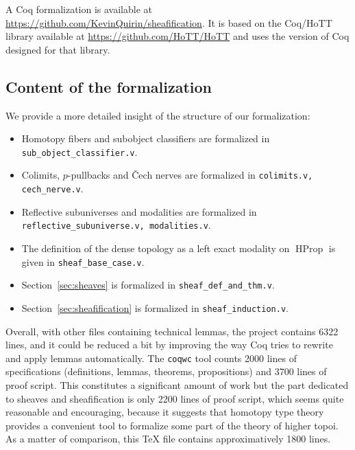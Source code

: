 \documentclass[conference]{IEEEtran}
\DeclareMathOperator{\HProp}{HProp}
\begin{document}
A Coq formalization is available at
\url{https://github.com/KevinQuirin/sheafification}.
%
It is based on the Coq/HoTT library available at
\url{https://github.com/HoTT/HoTT} and uses the version of Coq
designed for that library.
%

\subsection{Content of the formalization}

We provide a more detailed insight of the structure of our formalization:
\begin{itemize} 
\item  Homotopy fibers and subobject classifiers are formalized in
\texttt{sub\_object\_classifier.v}.%
%
\item Colimits, $p$-pullbacks and \v{C}ech nerves are formalized in
\texttt{colimits.v, cech\_nerve.v}.%
\item
Reflective subuniverses and modalities are formalized in
\texttt{reflective\_subuniverse.v, modalities.v}. %
\item 
%
  The definition of the dense topology as a left exact modality on
  $\HProp$ is given in \texttt{sheaf\_base\_case.v}. %
\item
Section~\ref{sec:sheaves} is formalized in
\texttt{sheaf\_def\_and\_thm.v}. %
\item
Section~\ref{sec:sheafification} is formalized in
\texttt{sheaf\_induction.v}. %
\end{itemize}

Overall, with other files containing technical lemmas, the project
contains 6322 lines, and it could be reduced a bit by improving the
way Coq tries to rewrite and apply lemmas automatically. 
The \texttt{coqwc} tool counts 2000 lines of specifications
(definitions, lemmas, theorems, propositions) and 3700 lines of proof
script.
%
This constitutes a significant amount of work but the part dedicated
to sheaves and sheafification is only 2200 lines of proof script,
which seems quite reasonable and encouraging, because it suggests
that homotopy type theory provides a convenient tool to formalize some
part of the theory of higher topoi. As a matter of comparison, this
\TeX\xspace file contains approximatively 1800 lines.
\end{document}
